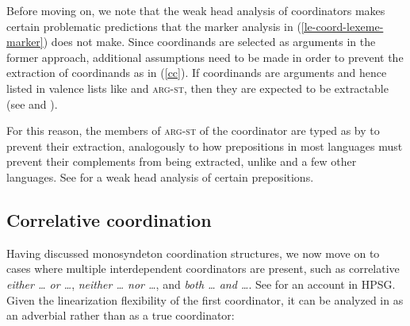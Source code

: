 Before moving on, we note that the weak head analysis of coordinators makes certain problematic
predictions that the marker analysis in (\ref{le-coord-lexeme-marker}) does not make. Since
coordinands are selected as arguments in the former approach,  additional assumptions need to be
made in order to prevent the  extraction of coordinands as in (\ref{cc}). If coordinands are
arguments and hence listed in valence lists like \comps and \textsc{arg-st}, then they are
expected to be extractable (see  and
\crossrefchapteralt[\page
\pageref{page-hpsg-traceless-account-arg-st-extraction-conjuncts}]{islands}). 


\z




\noindent
For this reason, the members of \textsc{arg-st} of the coordinator are typed as  by \citet[]{Abeille:03} to prevent their extraction, analogously to how prepositions in most languages must prevent their complements from being extracted, unlike  and a few other languages.
See \citet[Section~3.2]{Abeille06} for a weak head analysis of certain  prepositions.




\subsection{Correlative coordination}\label{correlphr}

Having discussed monosyndeton coordination structures, we now move on to cases where
multiple interdependent coordinators are present, such as correlative \emph{either \ldots{} or \ldots{}},
\emph{neither \ldots{} nor \ldots{}}, 
and \emph{both \ldots{} and \ldots{}}. See \citet{hof} for an account  in HPSG. Given the linearization flexibility of the first coordinator, it can be analyzed in  as an adverbial rather than as a true coordinator:

